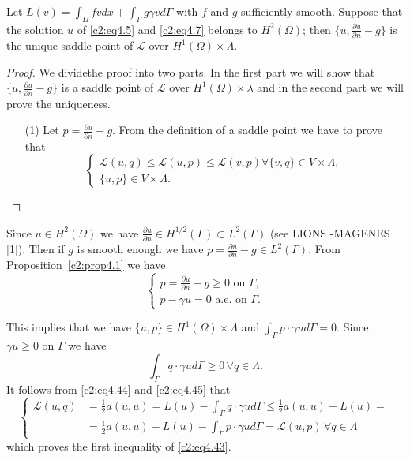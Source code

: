 \begin{theorem}\label{c2:thm4.4}%
 Let  $L(v) = \int_\Omega f v dx + \int_\Gamma g \gamma v d \Gamma$
 with $f$ and $g$ sufficiently smooth. Suppose that  the solution $u$
 of \eqref{c2:eq4.5} and \eqref{c2:eq4.7} belongs to $H^2(\Omega)$;
 then $\{u, \frac{\partial u}{\partial n} -g\}$ is the unique saddle
 point of  $\mathscr{L}$ over $H^1(\Omega) \times \Lambda$. 
\end{theorem} 	

\begin{proof}
We divide\pageoriginale  the proof into two parts. In the first part we will show
that $\{u, \frac{\partial u}{\partial n}- g \}$ is a saddle point of
$\mathscr{L}$ over $H^1(\Omega) \times \lambda$ and in the second part
we will prove the uniqueness.  
\begin{enumerate}
\item[(1)] Let $p = \frac{\partial u}{\partial n} - g$. From the
  definition of a saddle point we have to prove that  
\begin{equation}
\begin{cases}
\mathscr{L}(u, q) \leq \mathscr{L} (u, p) \leq \mathscr{L} (v,p)
\forall \{v, q\} \in V \times \Lambda ,\\ 
 \{u, p\}\in V \times \Lambda . \tag{4.43}\label{c2:eq4.43}
\end{cases}
 \end{equation} 
\end{enumerate}
\end{proof}

Since $u \in H^2 (\Omega)$ we have $\frac{\partial u}{\partial n}
\in H^{1/2}(\Gamma) \subset L^2(\Gamma)$ (see LIONS -MAGENES
[1]). Then if $g$ is smooth enough we have $p =
\frac{\partial u}{\partial n} - g \in L^2(\Gamma)$. From
Proposition~\ref{c2:prop4.1} we have  
\begin{equation}
\begin{cases}
p = \frac{\partial u}{\partial n}- g \geq 0 \text{ on } \Gamma ,\\
p - \gamma u = 0 \text{ a.e. on } \Gamma. \tag{4.44}\label{c2:eq4.44}
\end{cases}
\end{equation}

This implies that we have $\{u, p\} \in H^1 (\Omega) \times
\Lambda$ and $\int_\Gamma p \cdot \gamma u d \Gamma = 0$. Since
$\gamma u \geq 0$ on $\Gamma$ we have  
\begin{equation}
\int_\Gamma q \cdot \gamma u d \Gamma \geq 0\, \forall  q \in
\Lambda .\tag{4.45}\label{c2:eq4.45} 
\end{equation}
It follows from \eqref{c2:eq4.44} and \eqref{c2:eq4.45} that
\begin{equation*}
\begin{cases}
\mathscr{L} (u, q) & = \frac{1}{2} a (u, u) = L (u)- \int_\Gamma q
\cdot \gamma u d \Gamma \leq \frac{1}{2} a (u, u) - L (u) =\\ 
& = \frac{1}{2} a (u, u) - L(u) - \int_\Gamma p \cdot \gamma u d
\Gamma = \mathscr{L} (u, p)\, \forall  q \in \Lambda   
\end{cases}
\end{equation*}
which proves the first inequality of \eqref{c2:eq4.43}. 

